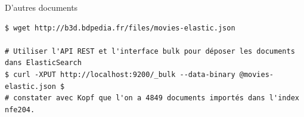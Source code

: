 \begin{frame}[fragile]{D'autres documents}
  \begin{verbatim}
$ wget http://b3d.bdpedia.fr/files/movies-elastic.json

# Utiliser l'API REST et l'interface bulk pour déposer les documents dans ElasticSearch
$ curl -XPUT http://localhost:9200/_bulk --data-binary @movies-elastic.json $
# constater avec Kopf que l'on a 4849 documents importés dans l'index nfe204.
\end{verbatim} 
\end{frame}


